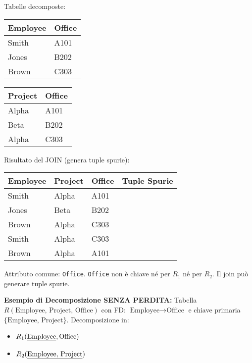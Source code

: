 \documentclass{article}
\begin{document}
	\noindent Tabelle decomposte:
	\begin{center}
	\begin{tabular}{|l|l|}
		\hline
		\textbf{Employee} & \textbf{Office} \\ \hline
		Smith & A101 \\ \hline
		Jones & B202 \\ \hline
		Brown & C303 \\ \hline
	\end{tabular}
	\quad
	\begin{tabular}{|l|l|}
		\hline
		\textbf{Project} & \textbf{Office} \\ \hline
		Alpha & A101 \\ \hline
		Beta & B202 \\ \hline
		Alpha & C303 \\ \hline
	\end{tabular}
	\end{center}

	\noindent Risultato del JOIN (genera tuple spurie):
	\begin{center}
	\begin{tabular}{|l|l|l|c|}
		\hline
		\textbf{Employee} & \textbf{Project} & \textbf{Office} & \textbf{Tuple Spurie} \\ \hline
		Smith & Alpha & A101 & \\ \hline
		Jones & Beta & B202 & \\ \hline
		Brown & Alpha & C303 & \\ \hline
		Smith & Alpha & C303 & \checkmark \\ \hline
		Brown & Alpha & A101 & \checkmark \\ \hline
	\end{tabular}
	\end{center}
	
	\noindent Attributo comune: \texttt{Office}. \texttt{Office} non è chiave né per $R_1$ né per $R_2$. Il join può generare tuple spurie.
	
	\textbf{Esempio di Decomposizione SENZA PERDITA:}
	Tabella $R(\text{Employee, Project, Office})$ con FD: $\text{Employee} \rightarrow \text{Office}$ e chiave primaria $\{\text{Employee, Project}\}$.
	Decomposizione in:
	\begin{itemize}
		\item $R_1(\text{\underline{Employee}}, \text{Office})$
		\item $R_2(\text{\underline{Employee, Project}})$
	\end{itemize}
	
\end{document}
